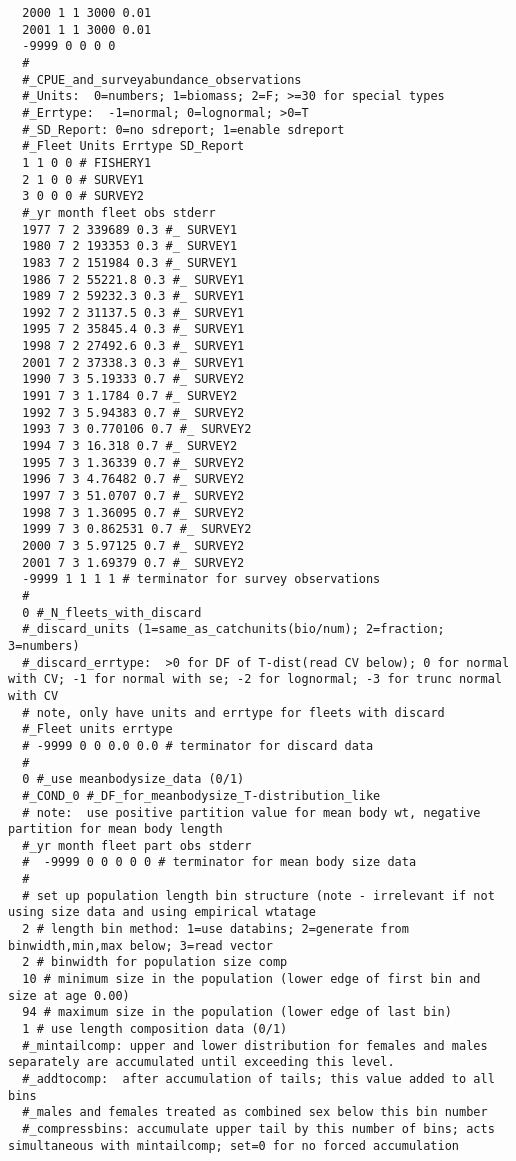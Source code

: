 \begin{landscape}
{\begin{verbatim}
  2000 1 1 3000 0.01
  2001 1 1 3000 0.01
  -9999 0 0 0 0
  #
  #_CPUE_and_surveyabundance_observations
  #_Units:  0=numbers; 1=biomass; 2=F; >=30 for special types
  #_Errtype:  -1=normal; 0=lognormal; >0=T
  #_SD_Report: 0=no sdreport; 1=enable sdreport
  #_Fleet Units Errtype SD_Report
  1 1 0 0 # FISHERY1
  2 1 0 0 # SURVEY1
  3 0 0 0 # SURVEY2
  #_yr month fleet obs stderr
  1977 7 2 339689 0.3 #_ SURVEY1
  1980 7 2 193353 0.3 #_ SURVEY1
  1983 7 2 151984 0.3 #_ SURVEY1
  1986 7 2 55221.8 0.3 #_ SURVEY1
  1989 7 2 59232.3 0.3 #_ SURVEY1
  1992 7 2 31137.5 0.3 #_ SURVEY1
  1995 7 2 35845.4 0.3 #_ SURVEY1
  1998 7 2 27492.6 0.3 #_ SURVEY1
  2001 7 2 37338.3 0.3 #_ SURVEY1
  1990 7 3 5.19333 0.7 #_ SURVEY2
  1991 7 3 1.1784 0.7 #_ SURVEY2
  1992 7 3 5.94383 0.7 #_ SURVEY2
  1993 7 3 0.770106 0.7 #_ SURVEY2
  1994 7 3 16.318 0.7 #_ SURVEY2
  1995 7 3 1.36339 0.7 #_ SURVEY2
  1996 7 3 4.76482 0.7 #_ SURVEY2
  1997 7 3 51.0707 0.7 #_ SURVEY2
  1998 7 3 1.36095 0.7 #_ SURVEY2
  1999 7 3 0.862531 0.7 #_ SURVEY2
  2000 7 3 5.97125 0.7 #_ SURVEY2
  2001 7 3 1.69379 0.7 #_ SURVEY2
  -9999 1 1 1 1 # terminator for survey observations 
  #
  0 #_N_fleets_with_discard
  #_discard_units (1=same_as_catchunits(bio/num); 2=fraction; 3=numbers)
  #_discard_errtype:  >0 for DF of T-dist(read CV below); 0 for normal with CV; -1 for normal with se; -2 for lognormal; -3 for trunc normal with CV
  # note, only have units and errtype for fleets with discard 
  #_Fleet units errtype
  # -9999 0 0 0.0 0.0 # terminator for discard data 
  #
  0 #_use meanbodysize_data (0/1)
  #_COND_0 #_DF_for_meanbodysize_T-distribution_like
  # note:  use positive partition value for mean body wt, negative partition for mean body length 
  #_yr month fleet part obs stderr
  #  -9999 0 0 0 0 0 # terminator for mean body size data 
  #
  # set up population length bin structure (note - irrelevant if not using size data and using empirical wtatage
  2 # length bin method: 1=use databins; 2=generate from binwidth,min,max below; 3=read vector
  2 # binwidth for population size comp 
  10 # minimum size in the population (lower edge of first bin and size at age 0.00) 
  94 # maximum size in the population (lower edge of last bin) 
  1 # use length composition data (0/1)
  #_mintailcomp: upper and lower distribution for females and males separately are accumulated until exceeding this level.
  #_addtocomp:  after accumulation of tails; this value added to all bins
  #_males and females treated as combined sex below this bin number 
  #_compressbins: accumulate upper tail by this number of bins; acts simultaneous with mintailcomp; set=0 for no forced accumulation

\end{verbatim}}
\end{landscape}
